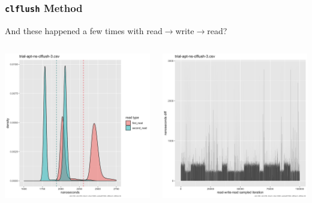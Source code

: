 \documentclass{beamer}
\begin{document}
\begin{frame}[t]
 \frametitle{\texttt{clflush} Method}
 And these happened a few times with read$\rightarrow$write$\rightarrow$read?

 \vspace{20pt}
 \begin{columns}
  \begin{column}{0.5\textwidth}
   \includegraphics[width=\linewidth]{trial-apt-ns-clflush-3-histogram.png}

  \end{column}
  \begin{column}{0.5\textwidth}
   \includegraphics[width=\linewidth]{trial-apt-ns-clflush-3-barchart.png}


\end{column}
\end{columns}
\end{frame}
\end{document}
